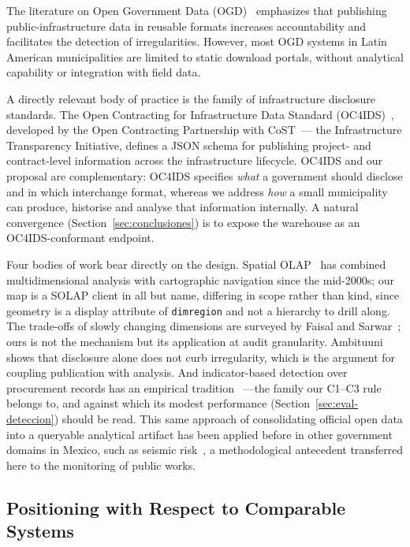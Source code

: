 \documentclass[runningheads]{llncs}
\renewcommand{\_}{\origunderscore\allowbreak}
\begin{document}
The literature on Open Government Data (OGD)~\cite{Lourenco2015} emphasizes that publishing public-infrastructure data in reusable formats increases accountability and facilitates the detection of irregularities. However, most OGD systems in Latin American municipalities are limited to static download portals, without analytical capability or integration with field data.

\begingroup
A directly relevant body of practice is the family of infrastructure disclosure standards. The Open Contracting for Infrastructure Data Standard (OC4IDS)~\cite{OC4IDS}, developed by the Open Contracting Partnership with CoST~--- the Infrastructure Transparency Initiative, defines a JSON schema for publishing project- and contract-level information across the infrastructure lifecycle. OC4IDS and our proposal are complementary: OC4IDS specifies \emph{what} a government should disclose and in which interchange format, whereas we address \emph{how} a small municipality can produce, historise and analyse that information internally. A natural convergence (Section~\ref{sec:conclusiones}) is to expose the warehouse as an OC4IDS-conformant endpoint.
\endgroup

Four bodies of work bear directly on the design. Spatial OLAP~\cite{Rivest2005} has combined multidimensional analysis with cartographic navigation since the mid-2000s; our map is a SOLAP client in all but name, differing in scope rather than kind, since geometry is a display attribute of \texttt{dim\_region} and not a hierarchy to drill along. The trade-offs of slowly changing dimensions are surveyed by Faisal and Sarwar~\cite{Faisal2014}; ours is not the mechanism but its application at audit granularity. Ambituuni~\cite{Ambituuni2026} shows that disclosure alone does not curb irregularity, which is the argument for coupling publication with analysis. And indicator-based detection over procurement records has an empirical tradition~\cite{Fazekas2020} ---the family our C1--C3 rule belongs to, and against which its modest performance (Section~\ref{sec:eval-deteccion}) should be read. This same approach of consolidating official open data into a queryable analytical artifact has been applied before in other government domains in Mexico, such as seismic risk~\cite{Hurtado2026}, a methodological antecedent transferred here to the monitoring of public works.

\subsection{Positioning with Respect to Comparable Systems}
\end{document}

